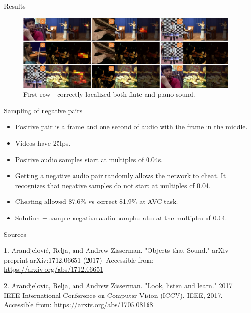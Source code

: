 \documentclass{beamer}
\begin{document}
\begin{frame}{Results}

\begin{figure}[h]
\includegraphics[width=\textwidth]{img/localize}
\caption{First row - correctly localized both flute and piano sound.}
\end{figure}

\end{frame}
\begin{frame}{Sampling of negative pairs}

\begin{itemize}
\item Positive pair is a frame and one second of audio with the frame in the middle.
\item Videos have 25fps.
\item Positive audio samples start at multiples of 0.04s.
\item Getting a negative audio pair randomly allows the network to cheat. It recognizes that negative samples do not start at multiples of 0.04.
\item Cheating allowed 87.6\% vs correct 81.9\% at AVC task.
\item Solution = sample negative audio samples also at the multiples of 0.04.
\end{itemize}
 



\end{frame}

\begin{frame}{Sources}

\begin{thebibliography}{0}

   1. Arandjelović, Relja, and Andrew Zisserman. "Objects that Sound." arXiv preprint arXiv:1712.06651 (2017). Accessible from: \url{https://arxiv.org/abs/1712.06651}
  
   2. Arandjelovic, Relja, and Andrew Zisserman. "Look, listen and learn." 2017 IEEE International Conference on Computer Vision (ICCV). IEEE, 2017. Accessible from: \url{https://arxiv.org/abs/1705.08168}
\end{thebibliography}
\end{frame}
 
 
 
\end{document}
